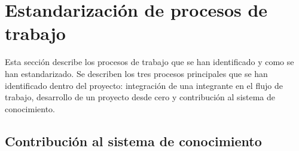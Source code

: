\section{Estandarización de procesos de trabajo}
Esta sección describe los procesos de trabajo que se
han identificado y como se han estandarizado. Se describen
los tres procesos principales que se han identificado dentro
del proyecto: integración de una integrante en el flujo de trabajo,
desarrollo de un proyecto desde cero y contribución al sistema
de conocimiento.




\subsection{Contribución al sistema de conocimiento}

\pagebreak
